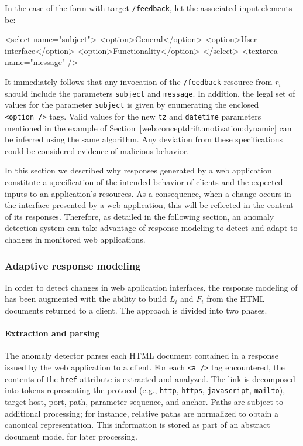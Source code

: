 In the case of the form with target \texttt{/feedback}, let the associated input elements be:

\begin{html}
    <select name="subject">
      <option>General</option>
      <option>User interface</option>
      <option>Functionality</option>
    </select>
    <textarea name="message" />
\end{html}

It immediately follows that any invocation of the \texttt{/feedback} resource from $r_i$ should include the parameters \texttt{subject} and \texttt{message}.  In addition, the legal set of values for the parameter \texttt{subject} is given by enumerating the enclosed \texttt{<option~/>} tags. Valid values for the new \texttt{tz} and \texttt{datetime} parameters mentioned in the example of Section~\ref{web:conceptdrift:motivation:dynamic} can be inferred using the same algorithm. Any deviation from these specifications could be considered evidence of malicious behavior.

In this section we described why responses generated by a web application constitute a specification of the intended behavior of clients and the expected inputs to an application's resources.  As a consequence, when a change occurs in the interface presented by a web application, this will be reflected in the content of its responses.  Therefore, as detailed in the following section, an anomaly detection system can take advantage of response modeling to detect and adapt to changes in monitored web applications.

\subsubsection{Adaptive response modeling}
\label{web:conceptdrift:design:responses}
In order to detect changes in web application interfaces, the response modeling of \webanomaly has been augmented with the ability to build $L_{i}$ and $F_{i}$ from the \ac{HTML} documents returned to a client. The approach is divided into two phases.

\paragraph{Extraction and parsing}
\label{web:conceptdrift:design:responses:extraction-parsing}
The anomaly detector parses each \ac{HTML} document contained in a response issued by the web application to a client.  For each \texttt{<a~/>} tag encountered, the contents of the \texttt{href} attribute is extracted and analyzed.  The link is decomposed into tokens representing the protocol (e.g., \texttt{http}, \texttt{https}, \texttt{javascript}, \texttt{mailto}), target host, port, path, parameter sequence, and anchor.  Paths are subject to additional processing; for instance, relative paths are normalized to obtain a canonical representation.  This information is stored as part of an abstract document model for later processing.

